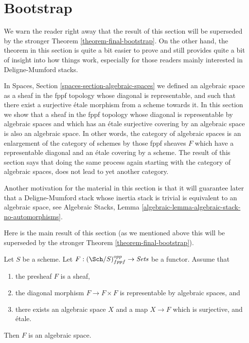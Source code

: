 \section{Bootstrap}
\label{section-bootstrap}

\noindent
We warn the reader right away that the result of this section will
be superseded by the stronger
Theorem \ref{theorem-final-bootstrap}.
On the other hand, the theorem in this section is quite a bit easier to
prove and still provides quite a bit of insight into how things work,
especially for those readers mainly interested in Deligne-Mumford
stacks.

\medskip\noindent
In
Spaces, Section \ref{spaces-section-algebraic-spaces}
we defined an algebraic space as a sheaf in the fppf topology whose
diagonal is representable, and such that there exist a surjective \'etale
morphism from a scheme towards it. In this section we show that
a sheaf in the fppf topology whose diagonal is representable by algebraic
spaces and which has an \'etale surjective covering by an algebraic space
is also an algebraic space.
In other words, the category of algebraic spaces is an enlargement of the
category of schemes by those fppf sheaves $F$ which have a representable
diagonal and an \'etale covering by a scheme. The
result of this section says that doing the same process again starting with
the category of algebraic spaces, does not lead to yet another category.

\medskip\noindent
Another motivation for the material in this section is that it will guarantee
later that a Deligne-Mumford stack whose inertia stack is trivial is equivalent
to an algebraic space, see
Algebraic Stacks, Lemma \ref{algebraic-lemma-algebraic-stack-no-automorphisms}.

\medskip\noindent
Here is the main result of this section (as we mentioned above this
will be superseded by the stronger
Theorem \ref{theorem-final-bootstrap}).

\begin{theorem}
\label{theorem-bootstrap}
Let $S$ be a scheme.
Let $F : (\Sch/S)_{fppf}^{opp} \to \textit{Sets}$ be a functor.
Assume that
\begin{enumerate}
\item the presheaf $F$ is a sheaf,
\item the diagonal morphism $F  \to F \times F$ is representable by
algebraic spaces, and
\item there exists an algebraic space $X$
and a map $X \to F$ which is surjective, and \'etale.
\end{enumerate}
Then $F$ is an algebraic space.
\end{theorem}

